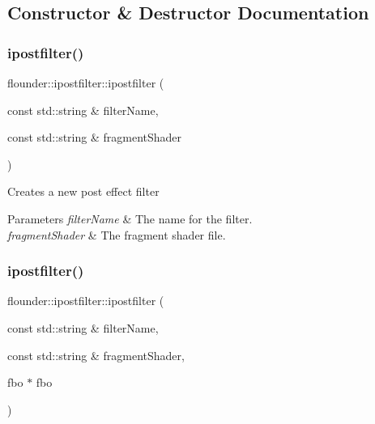 \subsection{Constructor \& Destructor Documentation}
\mbox{\label{classflounder_1_1ipostfilter_adb158fccda942f9d05ec2c21ea3f8654}} 
\subsubsection{\texorpdfstring{ipostfilter()}{ipostfilter()}\hspace{0.1cm}{\footnotesize\ttfamily [1/4]}}
{\footnotesize\ttfamily flounder\+::ipostfilter\+::ipostfilter (\begin{DoxyParamCaption}\item[{const std\+::string \&}]{filter\+Name,  }\item[{const std\+::string \&}]{fragment\+Shader }\end{DoxyParamCaption})}



Creates a new post effect filter 


\begin{DoxyParams}{Parameters}
{\em filter\+Name} & The name for the filter. \\
\hline
{\em fragment\+Shader} & The fragment shader file. \\
\hline
\end{DoxyParams}
\mbox{\label{classflounder_1_1ipostfilter_a2c792b5d59c2b47b1f3b75a7a1404df0}} 
\subsubsection{\texorpdfstring{ipostfilter()}{ipostfilter()}\hspace{0.1cm}{\footnotesize\ttfamily [2/4]}}
{\footnotesize\ttfamily flounder\+::ipostfilter\+::ipostfilter (\begin{DoxyParamCaption}\item[{const std\+::string \&}]{filter\+Name,  }\item[{const std\+::string \&}]{fragment\+Shader,  }\item[{fbo $\ast$}]{fbo }\end{DoxyParamCaption})}



